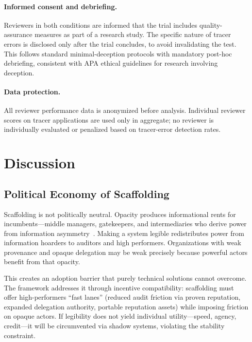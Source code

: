 \documentclass[runningheads]{llncs}
\begin{document}
\paragraph{Informed consent and debriefing.} Reviewers in both conditions are informed that the trial includes quality-assurance measures as part of a research study. The specific nature of tracer errors is disclosed only after the trial concludes, to avoid invalidating the test. This follows standard minimal-deception protocols with mandatory post-hoc debriefing, consistent with APA ethical guidelines for research involving deception.

\paragraph{Data protection.} All reviewer performance data is anonymized before analysis. Individual reviewer scores on tracer applications are used only in aggregate; no reviewer is individually evaluated or penalized based on tracer-error detection rates.


\section{Discussion}
\label{sec:discussion}

\subsection{Political Economy of Scaffolding}

Scaffolding is not politically neutral. Opacity produces informational rents for incumbents---middle managers, gatekeepers, and intermediaries who derive power from information asymmetry~\cite{holmstrom1991multitask}. Making a system legible redistributes power from information hoarders to auditors and high performers. Organizations with weak provenance and opaque delegation may be weak precisely because powerful actors benefit from that opacity.

This creates an adoption barrier that purely technical solutions cannot overcome. The framework addresses it through incentive compatibility: scaffolding must offer high-performers ``fast lanes'' (reduced audit friction via proven reputation, expanded delegation authority, portable reputation assets) while imposing friction on opaque actors. If legibility does not yield individual utility---speed, agency, credit---it will be circumvented via shadow systems, violating the stability constraint.
\end{document}
